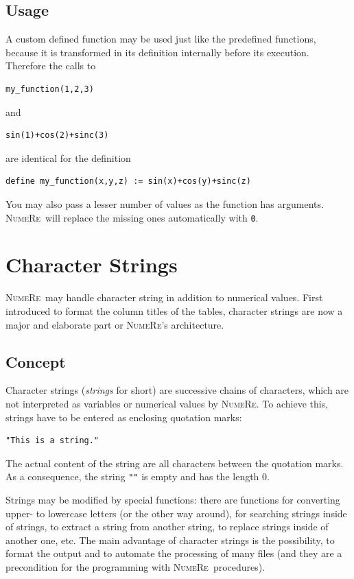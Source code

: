 \documentclass[DIV=14,headsepline,footsepline]{scrbook}
\newcommand{\NR}{\textsc{Nu\-me\-Re}}
\begin{document}
			\section{Usage}
				A custom defined function may be used just like the predefined functions, because it is transformed in its definition internally before its execution. Therefore the calls to
				\begin{lstlisting}
my_function(1,2,3)
				\end{lstlisting}
				and 
				\begin{lstlisting}
sin(1)+cos(2)+sinc(3)
				\end{lstlisting}
				are identical for the definition
				\begin{lstlisting}
define my_function(x,y,z) := sin(x)+cos(y)+sinc(z)
				\end{lstlisting}
				You may also pass a lesser number of values as the function has arguments. \NR\ will replace the missing ones automatically with \lstinline+0+.
		\chapter{Character Strings}
			\NR\ may handle character string in addition to numerical values. First introduced to format the column titles of the tables, character strings are now a major and elaborate part or \NR's architecture.
			\section{Concept}
				Character strings (\emph{strings} for short) are successive chains of characters, which are not interpreted as variables or numerical values by \NR. To achieve this, strings have to be entered as enclosing quotation marks:
				\begin{lstlisting}
"This is a string."
				\end{lstlisting}
				The actual content of the string are all characters between the quotation marks. As a consequence, the string \lstinline+""+ is empty and has the length 0.
				
				Strings may be modified by special functions: there are functions for converting upper- to lowercase letters (or the other way around), for searching strings inside of strings, to extract a string from another string, to replace strings inside of another one, etc. The main advantage of character strings is the possibility, to format the output and to automate the processing of many files (and they are a precondition for the programming with \NR\ procedures).
				
\end{document}
